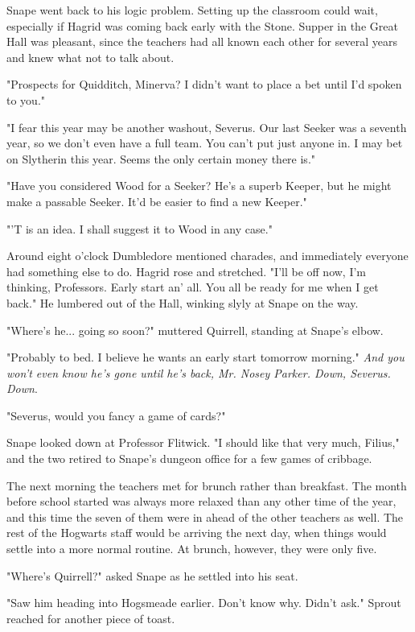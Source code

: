 \documentclass[a4paper,11pt]{article}
\begin{document}
Snape went back to his logic problem. Setting up the classroom could wait, especially if Hagrid was coming back early with the Stone. Supper in the Great Hall was pleasant, since the teachers had all known each other for several years and knew what not to talk about.

"Prospects for Quidditch, Minerva? I didn't want to place a bet until I'd spoken to you."

"I fear this year may be another washout, Severus. Our last Seeker was a seventh year, so we don't even have a full team. You can't put just anyone in. I may bet on Slytherin this year. Seems the only certain money there is."

"Have you considered Wood for a Seeker? He's a superb Keeper, but he might make a passable Seeker. It'd be easier to find a new Keeper."

"'T is an idea. I shall suggest it to Wood in any case."

Around eight o'clock Dumbledore mentioned charades, and immediately everyone had something else to do. Hagrid rose and stretched. "I'll be off now, I'm thinking, Professors. Early start an' all. You all be ready for me when I get back." He lumbered out of the Hall, winking slyly at Snape on the way.

"Where's he... going so soon?" muttered Quirrell, standing at Snape's elbow.

"Probably to bed. I believe he wants an early start tomorrow morning." \emph{And you won't even know he's gone until he's back, Mr. Nosey Parker. Down, Severus. Down}.

"Severus, would you fancy a game of cards?"

Snape looked down at Professor Flitwick. "I should like that very much, Filius," and the two retired to Snape's dungeon office for a few games of cribbage.

The next morning the teachers met for brunch rather than breakfast. The month before school started was always more relaxed than any other time of the year, and this time the seven of them were in ahead of the other teachers as well. The rest of the Hogwarts staff would be arriving the next day, when things would settle into a more normal routine. At brunch, however, they were only five.

"Where's Quirrell?" asked Snape as he settled into his seat.

"Saw him heading into Hogsmeade earlier. Don't know why. Didn't ask." Sprout reached for another piece of toast.
\end{document}
